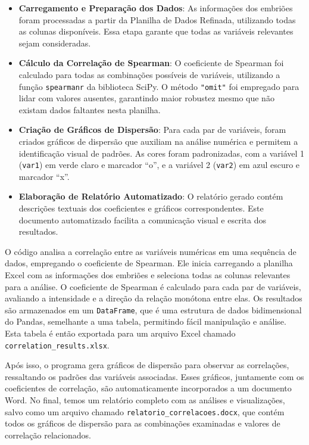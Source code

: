 \begin{itemize}
    \item \textbf{Carregamento e Preparação dos Dados}: As informações dos embriões foram processadas a partir da Planilha de Dados Refinada, utilizando todas as colunas disponíveis. Essa etapa garante que todas as variáveis relevantes sejam consideradas.
    \item \textbf{Cálculo da Correlação de Spearman}: O coeficiente de Spearman foi calculado para todas as combinações possíveis de variáveis, utilizando a função \texttt{spearmanr} da biblioteca SciPy. O método \texttt{"omit"} foi empregado para lidar com valores ausentes, garantindo maior robustez mesmo que não existam dados faltantes nesta planilha.
    \item \textbf{Criação de Gráficos de Dispersão}: Para cada par de variáveis, foram criados gráficos de dispersão que auxiliam na análise numérica e permitem a identificação visual de padrões. As cores foram padronizadas, com a variável 1 (\texttt{var1}) em verde claro e marcador ``o'', e a variável 2 (\texttt{var2}) em azul escuro e marcador ``x''.
    \item \textbf{Elaboração de Relatório Automatizado}: O relatório gerado contém descrições textuais dos coeficientes e gráficos correspondentes. Este documento automatizado facilita a comunicação visual e escrita dos resultados.
\end{itemize}

O código analisa a correlação entre as variáveis numéricas em uma sequência de dados, empregando o coeficiente de Spearman. Ele inicia carregando a planilha Excel com as informações dos embriões e seleciona todas as colunas relevantes para a análise. O coeficiente de Spearman é calculado para cada par de variáveis, avaliando a intensidade e a direção da relação monótona entre elas. Os resultados são armazenados em um \texttt{DataFrame}, que é uma estrutura de dados bidimensional do Pandas, semelhante a uma tabela, permitindo fácil manipulação e análise. Esta tabela é então exportada para um arquivo Excel chamado \texttt{correlation\_results.xlsx}.

Após isso, o programa gera gráficos de dispersão para observar as correlações, ressaltando os padrões das variáveis associadas. Esses gráficos, juntamente com os coeficientes de correlação, são automaticamente incorporados a um documento Word. No final, temos um relatório completo com as análises e visualizações, salvo como um arquivo chamado \texttt{relatorio\_correlacoes.docx}, que contém todos os gráficos de dispersão para as combinações examinadas e valores de correlação relacionados. 

